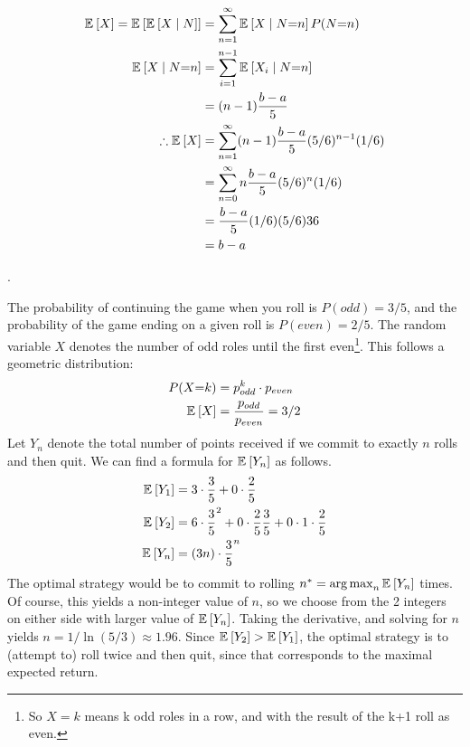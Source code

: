 \documentclass[11pt]{article}
\newcommand\myspace[1][]{\vspace{#1\bigskipamount}}
\newcommand\p{\Needspace{10\baselineskip} \noindent}
\begin{document}
\begin{align}
	\mathbb{E}_{}\left[X\right] 
		=  \mathbb{E}_{}\left[ \mathbb{E}_{}\left[X \mid N\right] \right] 
		&= \sum_{n=1}^{\infty} \mathbb{E}_{}\left[X \mid N{=}n\right] P(N{=}n) \\
	\mathbb{E}_{}\left[X \mid N{=}n\right]
		&= \sum_{i = 1}^{n -1} \mathbb{E}_{}\left[X_i \mid N{=}n\right] \\
		&= (n - 1) \frac{b -a}{5} \\
	 \therefore \mathbb{E}_{}\left[X\right]
	 	&= \sum_{n=1}^{\infty} (n - 1) \frac{b -a}{5} (5/6)^{n-1} (1/6) \\
	 	&= \sum_{n=0}^{\infty} n \frac{b -a}{5} (5/6)^{n} (1/6) \\
	 	&= \frac{b -a}{5} (1/6) (5/6) 36 \\
	 	&= b - a
\end{align}

\myspace
\p {}. 

The probability of continuing the game when you roll is $P(odd) = 3/5$, and the probability of the game ending on a given roll is $P(even) = 2/5$. The random variable $X$ denotes the number of odd roles until the first even\footnote{So $X=k$ means k odd roles in a row, and with the result of the k+1 roll as even.}. This follows a geometric distribution:
\begin{align}
	P(X{=}k)
		&= p_{odd}^k \cdot  p_{even} \\
	\mathbb{E}_{}\left[X\right]
		&= \frac{ p_{odd} }{ p_{even} } = 3/2
\end{align}
Let $Y_n$ denote the total number of points received if we commit to exactly $n$ rolls and then quit. We can find a formula for $\mathbb{E}_{}\left[Y_n\right]$ as follows. 
\begin{align}
	\mathbb{E}_{}\left[Y_1\right]
		&= 3 \cdot \frac{3}{5} + 0 \cdot \frac{2}{5} \\
	\mathbb{E}_{}\left[Y_2\right]
		&= 6 \cdot \frac{3}{5}^2 + 0 \cdot \frac{2}{5}\frac{3}{5} + 0 \cdot 1 \cdot \frac{2}{5} \\ 
	\mathbb{E}_{}\left[Y_n\right]
		&= (3n) \cdot \frac{3}{5}^{n}
\end{align}
The optimal strategy would be to commit to rolling $n^* = \operatorname*{arg\,max}_n \mathbb{E}_{}\left[Y_n\right]$ times. Of course, this yields a non-integer value of $n$, so we choose from the 2 integers on either side with larger value of $\mathbb{E}_{}\left[Y_n\right]$. Taking the derivative, and solving for $n$ yields $n = 1 / \ln(5/3) \approx 1.96$. Since $\mathbb{E}_{}\left[Y_2\right] > \mathbb{E}_{}\left[Y_1\right]$, the optimal strategy is to (attempt to) roll twice and then quit, since that corresponds to the maximal expected return. 
\end{document}
